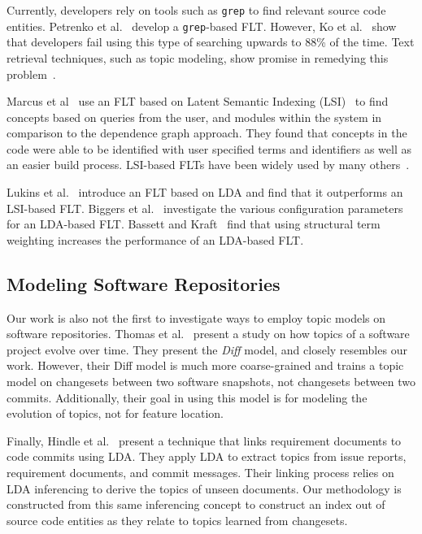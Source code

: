 Currently, developers rely on tools such as \texttt{grep} to find relevant
source code entities. Petrenko et al.~\cite{Petrenko-etal:2008} develop
a \texttt{grep}-based FLT. However, Ko et al.~\cite{Ko-etal:2006} show that
developers fail using this type of searching upwards to 88\% of the time.  Text
retrieval techniques, such as topic modeling, show promise in remedying this
problem~\cite{Marcus-etal:2004}.

Marcus et al~\cite{Marcus-etal:2004} use an FLT based on Latent Semantic
Indexing (LSI)~\cite{Deerwester-etal:1990} to find concepts based on queries
from the user, and modules within the system in comparison to the dependence
graph approach. They found that concepts in the code were able to be identified
with user specified terms and identifiers as well as an easier build process.
LSI-based FLTs have been widely used by many others~\cite{ Poshyvanyk-etal:2006,
Poshyvanyk-Marcus:2007, Liu-etal:2007, Scanniello-Marcus:2011, %
Cubranic-etal:2005}.

Lukins et al.~\cite{Lukins-etal:2008} introduce an FLT based on LDA and find
that it outperforms an LSI-based FLT.  Biggers et al.~\cite{Biggers-etal:2014}
investigate the various configuration parameters for an LDA-based FLT.  Bassett
and Kraft~\cite{Bassett-Kraft:2013} find that using structural term weighting
increases the performance of an LDA-based FLT.

\subsection{Modeling Software Repositories}

Our work is also not the first to investigate ways to employ topic models on
software repositories. Thomas et al.~\cite{Thomas-etal:2011} present a study on
how topics of a software project evolve over time. They present the \emph{Diff}
model, and closely resembles our work. However, their Diff model is much more
coarse-grained and trains a topic model on changesets between two software
snapshots, not changesets between two commits. Additionally, their goal in using
this model is for modeling the evolution of topics, not for feature location.

Finally, Hindle et al.~\cite{Hindle-etal:2009} present a technique that links
requirement documents to code commits using LDA.  They apply LDA to extract
topics from issue reports, requirement documents, and commit messages.  Their
linking process relies on LDA inferencing to derive the topics of unseen
documents.  Our methodology is constructed from this same inferencing concept to
construct an index out of source code entities as they relate to topics learned
from changesets.
